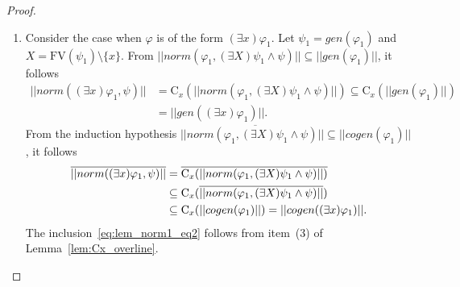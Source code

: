 \documentclass{lmcs}
\def\C{\textrm{C}}
\def\norm{norm}
\def\al{align}
\def\FV{\textrm{FV}}
\def\gen{gen}
\def\cogen{cogen}
\begin{document}
\begin{proof}
\begin{enumerate}
\begin{enumerate}
\item The subcase in which $\alpha_1$ is negative and $\alpha_2$ is positive can be proved analogously to the previous subcase.
\item Consider the subcase in which both $\alpha_1$ and $\alpha_2$ are negated. We have, by  \eqref{eq:align_subseteq} and by the induction hypothesis,
\begin{align*}
||\al(\overline{\alpha_1},\psi)||\subseteq||\overline{\alpha_1}||=\overline{||\alpha_1||}\subseteq||\cogen(\varphi_1)||
\end{align*}
and
\begin{align*}
||\al(\overline{\alpha_2},\psi)||\subseteq||\overline{\alpha_2}||=\overline{||\alpha_2||}\subseteq||\cogen(\varphi_2)||.
\end{align*}
Now, we have
\begin{align*}
\overline{||\norm(\varphi_1\wedge\varphi_2,\psi)||}&=||\al(\overline{\alpha_1},\psi)||\cup||\al(\overline{\alpha_2},\psi)||\\
 &\subseteq||\cogen(\varphi_1)||\cup||\cogen(\varphi_2)||\\
 &\subseteq\C_{X_1\setminus X_2}(||\cogen(\varphi_1)||)\cup\C_{X_2\setminus X_1}(||\cogen(\varphi_2)||)\\
 &=||\cogen(\varphi_1\wedge\varphi_2)||,
\end{align*}
where $X_1=\FV(\cogen(\varphi_1))$ and $X_2=\FV(\cogen(\varphi_2))$. 
\end{enumerate}
\item Consider the case when $\varphi$ is of the form $(\exists x)\varphi_1$. Let $\psi_1=\gen(\varphi_1)$ and $X=\FV(\psi_1)\setminus\{x\}$. From $||\norm(\varphi_1,(\exists X)\psi_1\wedge\psi)||\subseteq||\gen(\varphi_1)||$,
it follows
\begin{align*}
||\norm((\exists x)\varphi_1,\psi)||&=\C_x(||\norm(\varphi_1,(\exists X)\psi_1\wedge\psi)||)\subseteq\C_x(||\gen(\varphi_1)||)\\
&=||\gen((\exists x)\varphi_1)||.
\end{align*}
From the induction hypothesis $||\overline{\norm(\varphi_1,(\exists X)\psi_1\wedge\psi)||}\subseteq||\cogen(\varphi_1)||$, it follows
\begin{align}
\overline{||\norm((\exists x)\varphi_1,\psi)||}&=\overline{\C_x(||\norm(\varphi_1,(\exists X)\psi_1\wedge\psi)||)}\notag\\
&\subseteq\C_x(\overline{||\norm(\varphi_1,(\exists X)\psi_1\wedge\psi)||})\label{eq:lem_norm1_eq2}\\
&\subseteq\C_x(||\cogen(\varphi_1)||)=||\cogen((\exists x)\varphi_1)||\notag.
\end{align}
The inclusion~\eqref{eq:lem_norm1_eq2} follows from item~(3) of Lemma~\ref{lem:Cx_overline}. \qedhere

\end{enumerate} 
\end{proof}
\end{document}
